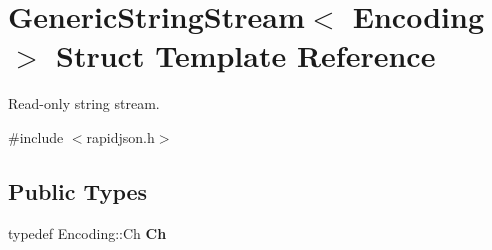 \hypertarget{struct_generic_string_stream}{}\section{Generic\+String\+Stream$<$ Encoding $>$ Struct Template Reference}
\label{struct_generic_string_stream}


Read-\/only string stream.  




{\ttfamily \#include $<$rapidjson.\+h$>$}

\subsection*{Public Types}
\begin{DoxyCompactItemize}
\item 
\hypertarget{struct_generic_string_stream_a4289aca895330084ff3168e37e4f08bd}{}typedef Encoding\+::\+Ch {\bfseries Ch}\label{struct_generic_string_stream_a4289aca895330084ff3168e37e4f08bd}

\end{DoxyCompactItemize}
